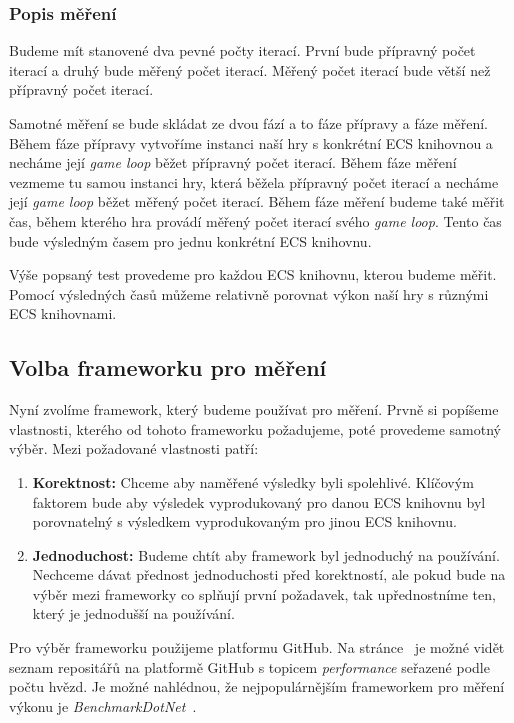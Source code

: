 \subsubsection{Popis měření}
Budeme mít stanovené dva pevné počty iterací. První bude přípravný počet iterací a druhý bude měřený počet iterací. Měřený počet iterací bude větší než přípravný počet iterací.

Samotné měření se bude skládat ze dvou fází a to fáze přípravy a fáze měření. Během fáze přípravy vytvoříme instanci naší hry s konkrétní ECS knihovnou a necháme její \textit{game loop} běžet přípravný počet iterací. Během fáze měření vezmeme tu samou instanci hry, která běžela přípravný počet iterací a necháme její \textit{game loop} běžet měřený počet iterací. Během fáze měření budeme také měřit čas, během kterého hra provádí měřený počet iterací svého \textit{game loop}. Tento čas bude výsledným časem pro jednu konkrétní ECS knihovnu.

Výše popsaný test provedeme pro každou ECS knihovnu, kterou budeme měřit. Pomocí výsledných časů můžeme relativně porovnat výkon naší hry s různými ECS knihovnami. 

\subsection{Volba frameworku pro měření}
Nyní zvolíme framework, který budeme používat pro měření. Prvně si popíšeme vlastnosti, kterého od tohoto frameworku požadujeme, poté provedeme samotný výběr. Mezi požadované vlastnosti patří:

\begin{enumerate}
    \item \textbf{Korektnost:} Chceme aby naměřené výsledky byli spolehlivé. Klíčovým faktorem bude aby výsledek vyprodukovaný pro danou ECS knihovnu byl porovnatelný s výsledkem vyprodukovaným pro jinou ECS knihovnu.
    \item \textbf{Jednoduchost:} Budeme chtít aby framework byl jednoduchý na používání. Nechceme dávat přednost jednoduchosti před korektností, ale pokud bude na výběr mezi frameworky co splňují první požadavek, tak upřednostníme ten, který je jednodušší na používání.
\end{enumerate}

Pro výběr frameworku použijeme platformu GitHub. Na stránce~\cite{github_performance} je možné vidět seznam repositářů na platformě GitHub s topicem \textit{performance} seřazené podle počtu hvězd. Je možné nahlédnou, že nejpopulárnějším frameworkem pro měření výkonu je \textit{BenchmarkDotNet}~\cite{BenchmarkDotNet}.

